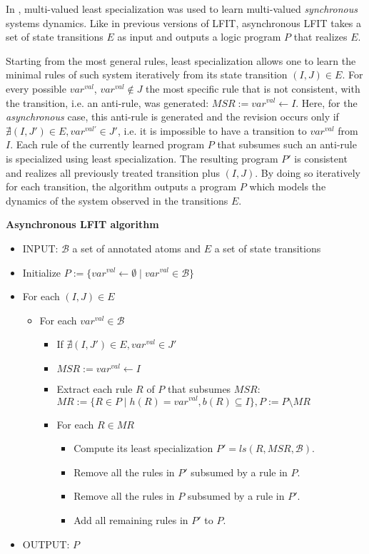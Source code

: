 In \cite{DMTRICLP15}, multi-valued least specialization was used to learn multi-valued \textit{synchronous} systems dynamics.
Like in previous versions of LFIT, asynchronous LFIT takes a set of state transitions $E$ as input and outputs a logic program $P$ that realizes $E$.

Starting from the most general rules, least specialization allows one to learn the minimal rules of such system iteratively from its state transition $(I,J) \in E$.
For every possible $var^{val}$, $var^{val} \not \in J$ the most specific rule that is not consistent, with the transition, i.e. an anti-rule, was generated: $MSR := var^{val} \leftarrow I$.
Here, for the \textit{asynchronous} case, this anti-rule is generated and the revision occurs only if $\nexists (I,J') \in E, var^{val'} \in J'$,
i.e. it is impossible to have a transition to $var^{val}$ from $I$.
Each rule of the currently learned program $P$ that subsumes such an anti-rule is specialized using least specialization.
The resulting program $P'$ is consistent and realizes all previously treated transition plus $(I,J)$.
By doing so iteratively for each transition, the algorithm outputs a program $P$ which models the dynamics of the system observed in the transitions $E$.

\vspace{0.5em}
\noindent
\textbf{Asynchronous LFIT algorithm}
\vspace{-0.4em}
\begin{itemize}
	\item INPUT: $\mathcal{B}$ a set of annotated atoms and $E$ a set of state transitions
	\item Initialize $P := \{var^{val} \leftarrow \emptyset \mid var^{val} \in \mathcal{B}\}$
	\item For each $(I,J) \in E$
	\begin{itemize}
		\item For each $var^{val} \in \mathcal{B}$
		\begin{itemize}
			\item If $\nexists (I,J') \in E, var^{val} \in J'$
			\item $MSR := var^{val} \leftarrow I$
			\item Extract each rule $R$ of $P$ that subsumes $MSR$: $MR := \{R \in P \mid h(R) = var^{val}, b(R) \subseteq I\}, P := P \setminus MR$
			\item For each $R \in MR$
			\begin{itemize}
				\item Compute its least specialization $P'=ls(R,MSR,\mathcal{B})$.
				\item Remove all the rules in $P'$ subsumed by a rule in $P$.
				\item Remove all the rules in $P$ subsumed by a rule in $P'$.
				\item Add all remaining rules in $P'$ to $P$.
			\end{itemize}
		\end{itemize}
	\end{itemize}
	\item OUTPUT: $P$
\end{itemize}

